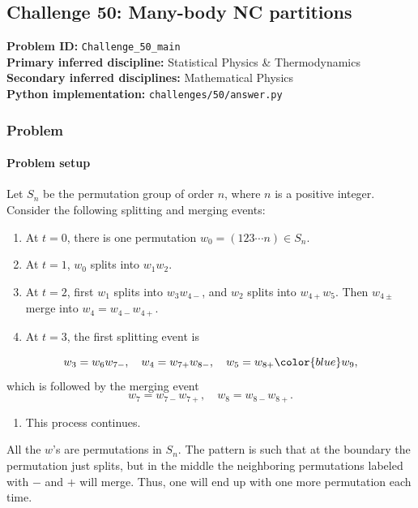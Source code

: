 \subsection[Challenge 50: Many-body NC partitions]{Challenge 50: Many-body NC partitions}
\textbf{Problem ID:} \texttt{Challenge\_50\_main}\\
\textbf{Primary inferred discipline:} Statistical Physics \& Thermodynamics\\
\textbf{Secondary inferred disciplines:} Mathematical Physics\\
\textbf{Python implementation:} \texttt{challenges/50/answer.py}

\subsubsection*{Problem}
\paragraph*{Problem setup}
Let $S_n$ be the permutation group of order $n$, where $n$ is a positive integer. Consider the following splitting and merging events:
\begin{enumerate}[leftmargin=*]
\item At $t = 0$, there is one permutation $w_0 = (123 \cdots n) \in S_n$.
\item At $t = 1$, $w_0$ splits into $w_1 w_2$.
\item At $t = 2$, first $w_1$ splits into $w_3 w_{4-}$, and $w_2$ splits into $w_{4+} w_5$. Then $w_{4\pm}$ merge into $w_4 = w_{4-} w_{4+}$.
\item At $t = 3$, the first splitting event is
\end{enumerate}
  \begin{equation}
  w_3 = w_6 w_{7-}, \quad w_4 = w_{7+} w_{8-}, \quad w_5 = w_{8+} {\color{blue}w_{9}},
  \end{equation}
 which is followed by the merging event
  \begin{equation}
  w_7 = w_{7-} w_{7+}, \quad w_8 = w_{8-} w_{8+}.
  \end{equation}
\begin{enumerate}[leftmargin=*]
\item This process continues.
\end{enumerate}

All the $w$'s are permutations in $S_n$. The pattern is such that at the boundary the permutation just splits, but in the middle the neighboring permutations labeled with $-$ and $+$ will merge. Thus, one will end up with one more permutation each time.

